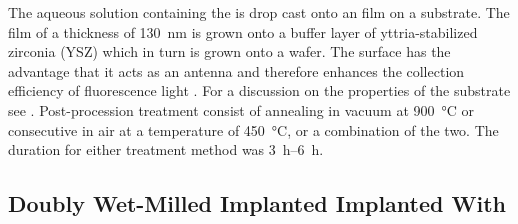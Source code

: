 		The aqueous solution containing the \nds is drop cast onto an \ir film on a \Si substrate.
		The \ir film of a thickness of \SI{130}{nm} is grown onto a buffer layer of yttria-stabilized zirconia (YSZ) which in turn is grown onto a \Si wafer.
		The \ir surface has the advantage that it acts as an antenna and therefore enhances the collection efficiency of fluorescence light \cite{Neu2012a}. For a discussion on the properties of the substrate see .
		Post-procession treatment consist of annealing in vacuum at \SI{900}{\degreeCelsius} or consecutive \ox in air at a temperature of \SI{450}{\degreeCelsius}, or a combination of the two.
		The duration for either treatment method was \SIrange{3}{6}{\hour}.

	\subsection{Doubly Wet-Milled Implanted \Nds Implanted With \Si}\label{subsec::2_milled_nds}

